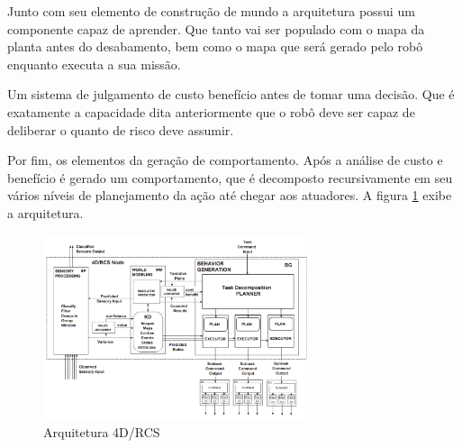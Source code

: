 \documentclass[
	article,			%
	11pt,				%
	oneside,			%
	a4paper,			%
	english,			%
	brazil,				%
	sumario=tradicional	
	]{abntex2}
\begin{document}
Junto com seu elemento de construção de mundo a arquitetura possui um componente capaz de aprender. Que tanto vai ser populado com o mapa da planta antes do desabamento, bem como o mapa que será gerado pelo robô enquanto executa a sua missão. 

Um sistema de julgamento de custo benefício antes de tomar uma decisão. Que é exatamente a capacidade dita anteriormente que o robô deve ser capaz de deliberar o quanto de risco deve assumir. 

Por fim, os elementos da geração de comportamento. Após a análise de custo e benefício é gerado um comportamento, que é decomposto recursivamente em seu vários níveis de planejamento da ação até chegar aos atuadores. A figura \ref{figure:arquitetura} exibe a arquitetura.

\begin{figure}
  \centering
  \includegraphics[width=0.7\textwidth]{4d-rcs.png}
  \caption{Arquitetura 4D/RCS \cite{albus2005rcs}}
  \label{figure:arquitetura}
\end{figure}




\postextual



\end{document}
